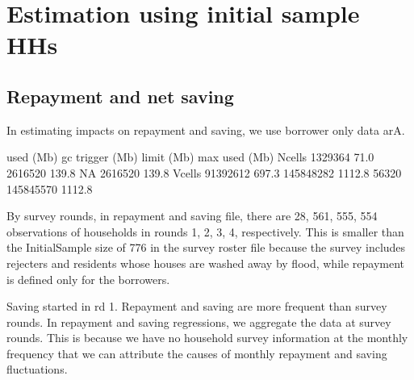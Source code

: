 \section{Estimation using initial sample HHs}


\subsection{Repayment and net saving}

In estimating impacts on repayment and saving, we use borrower only data \textsf{arA}.

\begin{Schunk}
\begin{Soutput}
           used  (Mb) gc trigger   (Mb) limit (Mb)  max used   (Mb)
Ncells  1329364  71.0    2616520  139.8         NA   2616520  139.8
Vcells 91392612 697.3  145848282 1112.8      56320 145845570 1112.8
\end{Soutput}
\end{Schunk}
By survey rounds, in repayment and saving file, there are 28, 561, 555, 554 observations of households in rounds 1, 2, 3, 4, respectively. This is smaller than the \textsf{InitialSample} size of 776 in the survey roster file because the survey includes rejecters and residents whose houses are washed away by flood, while repayment is defined only for the borrowers.

Saving started in rd 1. Repayment and saving are more frequent than survey rounds. In repayment and saving regressions, we aggregate the data at survey rounds. This is because we have no household survey information at the monthly frequency that we can attribute the causes of monthly repayment and saving fluctuations.

